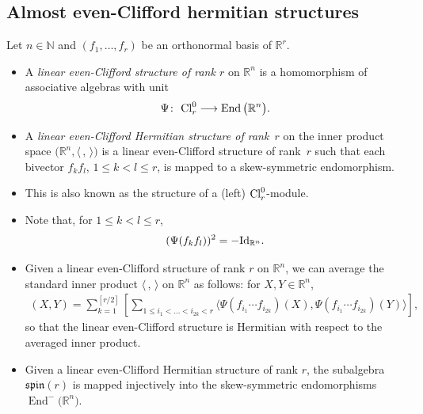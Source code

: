 \documentclass[pdftex]{sigma}
\numberwithin{equation}{section}
\begin{document}
\subsection{Almost even-Clifford hermitian structures}\label{subsec: almost even-Clifford hermitian structures}
\begin{Definition} Let $n\in \mathbb{N}$ and $(f_1,\dots,f_r)$ be an orthonormal basis of $\mathbb{R}^r$.
\begin{itemize}\itemsep=0pt
\item A {\em linear even-Clifford structure of rank $r$} on $\mathbb{R}^n$ is a homomorphism of associative algebras with unit
\begin{gather*}\Psi\colon \ {\rm Cl}_r^0\longrightarrow \operatorname{End}\big(\mathbb{R}^n\big).\end{gather*}
\item A {\em linear even-Clifford Hermitian structure of rank~$r$} on the inner product space $\big(\mathbb{R}^n,\langle \,,\,\rangle \big)$ is a linear even-Clifford structure of rank~$r$ such that each bivector $f_kf_l$, $1\leq k< l \leq r$, is mapped to a skew-symmetric
endomorphism.
\end{itemize}
\end{Definition}

\begin{Remark}\quad
\begin{itemize}\itemsep=0pt
\item This is also known as the structure of a (left) ${\rm Cl}_r^0$-module.
\item Note that, for $1\leq k<l\leq r$,
\begin{gather*}
(\Psi(f_kf_l))^2=-{\rm Id}_{\mathbb{R}^n}.
\end{gather*}
\item Given a linear even-Clifford structure of rank $r$ on $\mathbb{R}^n$, we can average the standard inner product $\langle \,,\,\rangle $ on $\mathbb{R}^n$ as follows: for $X,Y\in\mathbb{R}^n$,
\begin{gather*}(X,Y)=\sum_{k=1}^{[r/2]} \left[\sum_{1\leq i_1<\dots<i_{2k}<r}
\langle \Psi(f_{i_1}\cdots f_{i_{2k}})(X),\Psi(f_{i_1}\cdots f_{i_{2k}})(Y)\rangle \right], \end{gather*}
so that the linear even-Clifford structure is Hermitian with respect to the averaged inner product.
\item Given a linear even-Clifford Hermitian structure of rank $r$, the subalgebra $\mathfrak{spin}(r)$ is mapped injectively into the skew-symmetric endomorphisms $\operatorname{End}^-\big(\mathbb{R}^n\big)$.
\end{itemize}
\end{Remark}
\end{document}
